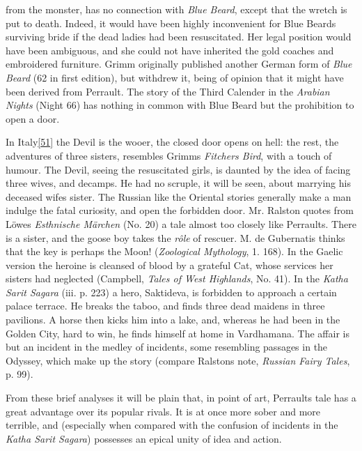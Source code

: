 \documentclass[14pt,a4paper]{memoir}
\begin{document}
from the monster, has no connection with \emph{Blue Beard}, except that
the wretch is put to death. Indeed, it would have been highly
inconvenient for Blue Beard\textquotesingle s surviving bride if the
dead ladies had been resuscitated. Her legal position would have been
ambiguous, and she could not have inherited the gold coaches and
embroidered furniture. Grimm originally published another German form of
\emph{Blue Beard} (62 in first edition), but withdrew it, being of
opinion that it might have been derived from Perrault. The story of the
Third Calender in the \emph{Arabian Nights} (Night 66) has nothing in
common with Blue Beard but the prohibition to open a door.

In
Italy\protect\hypertarget{4533318093929944247_33931-h-0.htm.xhtmlux5cux23FNanchor_51}{}{}\protect\hyperlink{4533318093929944247_33931-h-0.htm.xhtmlux5cux23Footnote_51}{{[}51{]}}
the Devil is the wooer, the closed door opens on hell: the rest, the
adventures of three sisters, resembles Grimm\textquotesingle s
\emph{Fitcher\textquotesingle s Bird}, with a touch of humour. The
Devil, seeing the resuscitated girls, is daunted by the idea of facing
three wives, and decamps. He had no scruple, it will be seen, about
marrying his deceased wife\textquotesingle s sister. The Russian like
the Oriental stories generally make a man indulge the fatal curiosity,
and open the forbidden door. Mr. Ralston quotes from
Löwe\textquotesingle s \emph{Esthnische Märchen} (No. 20) a tale almost
too closely like Perrault\textquotesingle s. There is a sister, and the
goose boy takes the \emph{rôle} of rescuer. M. de Gubernatis thinks that
the key \textquotesingle is perhaps the Moon!\textquotesingle{}
(\emph{Zoological Mythology}, 1. 168). In the Gaelic version the heroine
is cleansed of blood by a grateful Cat, whose services her sisters had
neglected (Campbell, \emph{Tales of West Highlands}, No. 41). In the
\emph{Katha Sarit Sagara} (iii. p. 223) a hero, Saktideva, is forbidden
to approach a certain palace terrace. He breaks the taboo, and finds
three dead maidens in three pavilions. A horse then kicks him into a
lake, and, whereas he had been in the Golden City, hard to win, he finds
himself at home in Vardhamana. The affair is but an incident in the
medley of incidents, some resembling passages in the Odyssey, which make
up the story (compare Ralston\textquotesingle s note, \emph{Russian
Fairy Tales}, p. 99).

From these brief analyses it will be plain that, in point of art,
Perrault\textquotesingle s tale has a great advantage over its popular
rivals. It is at once more sober and more terrible, and (especially when
compared with the confusion of incidents in the \emph{Katha Sarit
Sagara}) possesses an epical unity of idea and action.
\end{document}
